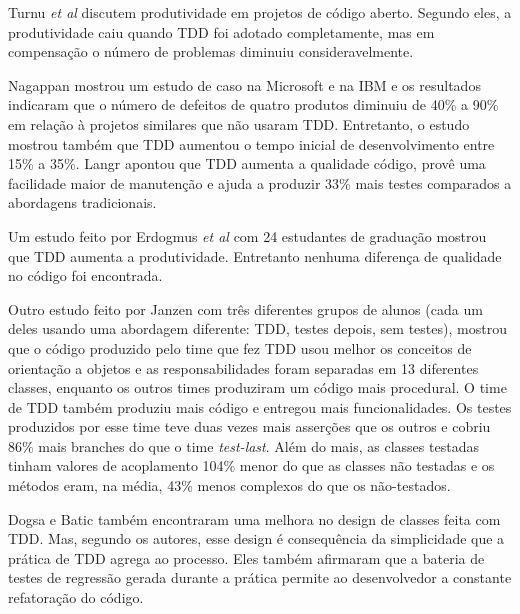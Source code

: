 Turnu \textit{et al} \cite{turnu-tdd-opensouce} discutem produtividade em
projetos de código aberto. Segundo eles, a produtividade caiu quando TDD foi
adotado completamente, mas em compensação o número de problemas diminuiu 
consideravelmente.

Nagappan \cite{nagappan-ms} mostrou um estudo de caso na Microsoft e na IBM e os
resultados indicaram que o número de defeitos de quatro produtos diminuiu de 
40\% a 90\% em relação à projetos similares que não usaram TDD. Entretanto, o 
estudo mostrou também que TDD aumentou o tempo inicial de desenvolvimento entre 15\%
a 35\%. Langr \cite{langr} apontou que TDD aumenta a qualidade código, provê uma 
facilidade maior de manutenção e ajuda a produzir 33\% mais testes comparados  a
abordagens tradicionais.

Um estudo feito por Erdogmus \textit{et al} \cite{erdogmus-morisio} com 24 estudantes de
graduação mostrou que TDD aumenta a produtividade. Entretanto nenhuma diferença 
de qualidade no código foi encontrada.

Outro estudo feito por Janzen \cite{janzen-saiedian} com três diferentes grupos
de alunos (cada um deles usando uma abordagem diferente: TDD, testes depois, sem
testes), mostrou que o código produzido pelo time que fez TDD usou melhor os
conceitos de orientação a objetos e as responsabilidades foram separadas em 13 
diferentes classes, enquanto os outros times produziram um código mais
procedural. O time de TDD também produziu mais código e entregou mais
funcionalidades. Os testes produzidos por esse time teve duas vezes mais
asserções que os outros e cobriu 86\% mais branches do que o time \textit{test-last}. 
Além do mais, as classes testadas tinham valores de acoplamento 104\% menor do 
que as classes não testadas e os métodos eram, na média, 43\% menos complexos 
do que os não-testados.

Dogsa e Batic \cite{dogsa-batic} também encontraram uma melhora no
design de classes feita com TDD. Mas, segundo os autores, esse design é 
consequência da simplicidade que a prática de TDD agrega ao processo. Eles
também  afirmaram que a bateria de testes de regressão gerada durante a prática 
permite ao desenvolvedor a constante refatoração do código.

